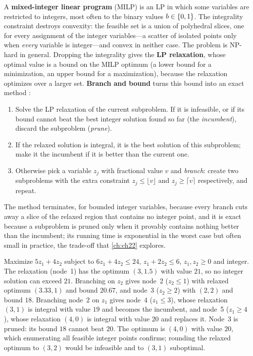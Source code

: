 A \textbf{mixed-integer linear program}
(MILP) is an LP in which some variables are restricted to integers, most
often to the binary values $b \in \left\{ 0, 1 \right\}$. The integrality constraint
destroys convexity: the feasible set is a union of polyhedral slices, one for
every assignment of the integer variables---a scatter of isolated points only
when \emph{every} variable is integer---and convex in neither case. The
problem is NP-hard in general. Dropping the integrality
gives the \textbf{LP relaxation}, whose optimal value is
a bound on the MILP optimum (a lower bound for a minimization, an upper
bound for a maximization), because the relaxation optimizes over a larger
set. \textbf{Branch and bound} turns this bound into
an exact method \cite{wolsey1998integer}:
\begin{enumerate}
  \item Solve the LP relaxation of the current subproblem. If it is infeasible, or if its bound cannot beat the best integer solution found so far (the \emph{incumbent}), discard the subproblem (\emph{prune}).
  \item If the relaxed solution is integral, it is the best solution of this subproblem; make it the incumbent if it is better than the current one.
  \item Otherwise pick a variable $z_j$ with fractional value $v$ and \emph{branch}: create two subproblems with the extra constraint $z_j \le \lfloor v\rfloor$ and $z_j \ge \lceil v\rceil$ respectively, and repeat.
\end{enumerate}
The method terminates, for bounded integer variables, because every branch
cuts away a slice of the relaxed region that contains no integer point, and it is exact because a subproblem is
pruned only when it provably contains nothing better than the incumbent; its
running time is exponential in the worst case but often small in practice,
the trade-off that \cref{ch:ch22} explores.

\begin{example}
\label{ex:appB-bnb}
Maximize $5z_1 + 4z_2$ subject to $6z_1 + 4z_2 \le 24$, $z_1 + 2z_2 \le 6$, $z_1, z_2 \ge 0$ and integer. The relaxation (node~1) has the optimum $(3, 1.5)$ with value $21$, so no integer solution can exceed $21$. Branching on $z_2$ gives node~2 ($z_2 \le 1$) with relaxed optimum $(3.33, 1)$ and bound $20.67$, and node~3 ($z_2 \ge 2$) with $(2, 2)$ and bound $18$. Branching node~2 on $z_1$ gives node~4 ($z_1 \le 3$), whose relaxation $(3, 1)$ is integral with value $19$ and becomes the incumbent, and node~5 ($z_1 \ge 4$), whose relaxation $(4, 0)$ is integral with value $20$ and replaces it. Node~3 is pruned: its bound $18$ cannot beat $20$. The optimum is $(4, 0)$ with value $20$, which enumerating all feasible integer points confirms; rounding the relaxed optimum to $(3, 2)$ would be infeasible and to $(3, 1)$ suboptimal.
\end{example}

